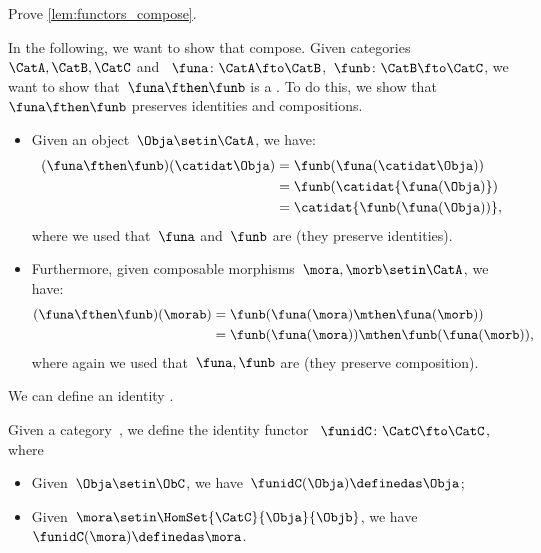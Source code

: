 \begin{exercise}
    Prove \cref{lem:functors_compose}.
\end{exercise}
\begin{solution}
    In the following, we want to show that  compose.
    Given categories~$\CatA,\CatB,\CatC$ and ~$\funa\colon \CatA\fto \CatB$,~$\funb \colon \CatB\fto \CatC$, we want to show that~$\funa\fthen\funb$ is a .
    To do this, we show that~$\funa\fthen\funb$ preserves identities and compositions.
    \begin{itemize}
        \item Given an object~$\Obja\setin \CatA$, we have:
              \begin{equation}
                  \begin{aligned}
                      (\funa\fthen\funb)(\catidat\Obja)
                       & =\funb(\funa(\catidat\Obja)) \\
                       & =\funb(\catidat{\funa(\Obja)}) \\
                       & =\catidat{\funb(\funa(\Obja))},
                  \end{aligned}
              \end{equation}
              where we used that~$\funa$ and~$\funb$ are  (they preserve identities).
        \item Furthermore, given composable morphisms~$\mora,\morb\setin \CatA$, we have:
              \begin{equation}
                  \begin{aligned}
                      (\funa\fthen\funb)(\morab)
                       & =\funb(\funa(\mora)\mthen \funa(\morb)) \\
                       & =\funb(\funa(\mora))\mthen \funb(\funa(\morb)),
                  \end{aligned}
              \end{equation}
              where again we used that~$\funa,\funb$ are  (they preserve composition).
    \end{itemize}
\end{solution}

We can define an identity .

\begin{ctdefinition}
    \label{def:identity_functor}
    Given a category~\CatC, we define the identity functor ~$\funidC\colon \CatC \fto \CatC$, where
    \begin{itemize}
        \item Given~$\Obja\setin \ObC$, we have~$\funidC(\Obja)\definedas \Obja$;
        \item Given~$\mora \setin \HomSet{\CatC}{\Obja}{\Objb}$, we have~$\funidC(\mora)\definedas \mora$.
    \end{itemize}
\end{ctdefinition}

